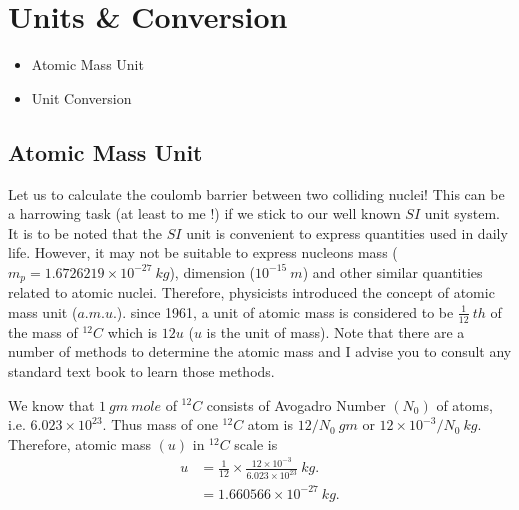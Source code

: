 \chapter{Units \& Conversion}

\vspace{2cm}\begin{tcolorbox}
    [colframe=black!90!white,colback=yellow!29.05!white,arc=0.75em,fonttitle=\bfseries,title= \textit{Key Objective:}, width = \textwidth]   
        \begin{itemize}
        \item Atomic Mass Unit
        \item Unit Conversion
        \end{itemize}
    \end{tcolorbox}
   
   
\pagebreak\section{{Atomic Mass Unit}}
    Let us to calculate the coulomb barrier between two colliding nuclei! This can be a harrowing task (at least to me !) if we stick to our well known $SI$ unit system. It is to be noted that the $SI$ unit is convenient to express quantities used in daily life. However, it may not be suitable to express nucleons mass ($m_p=1.6726219×10^{-27} \ kg$), dimension ($10^{-15} \ m$) and other similar quantities related to atomic nuclei. Therefore, physicists introduced the concept of atomic mass unit ($a.m.u.$). since 1961, a unit of atomic mass is considered to be $\frac{1}{12} \ th$ of the mass of $^{12}C$ which is $12u$ ($u$ is the unit of mass). Note that there are a number of methods to determine the atomic mass and I advise you to consult any standard text book to learn those methods.\\
    \par We know that $1 \ gm \ mole$ of $^{12}C$ consists of Avogadro Number $(N_0)$ of atoms, i.e. $6.023×10^{23}$. Thus mass of one $^{12}C$ atom is ${12}/{N_0} \ gm$ or ${12×10^{-3}}/{N_0} \ kg$. Therefore, atomic mass $(u)$ in $^{12}C$ scale is 
    \begin{equation}
        \begin{split}
    u &= \frac{1}{12} × \frac{12×10^{-3}}{6.023×10^{23}} \ kg. \\[12pt]
    &= 1.660566×10^{-27} \ kg. \\[12pt]
        \end{split}
    \end{equation}
